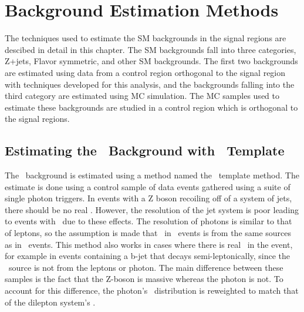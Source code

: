 \chapter{Background Estimation Methods}
\label {ch:bkgd}
The techniques used to estimate the SM backgrounds in the signal regions are descibed in detail in this chapter.
The SM backgrounds fall into three categories, Z+jets, Flavor symmetric, and other SM backgrounds.
The first two backgrounds are estimated using data from a control region orthogonal to the signal region with techniques developed for this analysis,
and the backgrounds falling into the third category are estimated using MC simulation.
The MC samples used to estimate these backgrounds are studied in a control region which is orthogonal to the signal regions.

\section{Estimating the \texorpdfstring{\zjets}{Z+jets}\ Background with \texorpdfstring{\MET}{MET}\ Template}
\label{sec:bkg_zjets}
The \zjets\ background is estimated using a method named the \MET\ template method.
The estimate is done using a control sample of data events gathered using a suite of single photon triggers.
In events with a Z boson recoiling off of a system of jets, there should be no real \MET.
However, the resolution of the jet system is poor leading to events with \MET\ due to these effects.
The resolution of photons is similar to that of leptons,
so the assumption is made that \MET\ in \gjets\ events is from the same sources as in \zjets\ events.
This method also works in cases where there is real \MET\ in the event,
for example in events containing a b-jet that decays semi-leptonically,
since the \MET\ source is not from the leptons or photon.
The main difference between these samples is the fact that the Z-boson is massive whereas the photon is not.
To account for this difference,
the photon's \pt\ distribution is reweighted to match that of the dilepton system's \pt.

